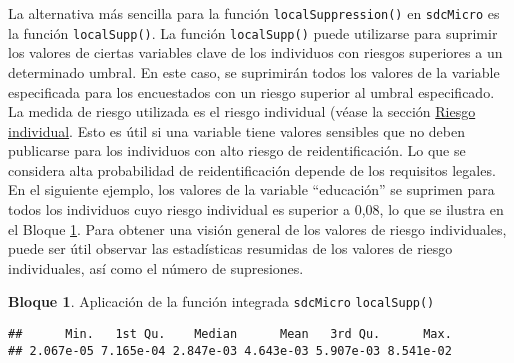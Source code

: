 \documentclass[
]{book}
\newenvironment{Shaded}{\begin{snugshade}}{\end{snugshade}}
\newcommand{\CommentTok}[1]{\textcolor[rgb]{0.56,0.35,0.01}{\textit{#1}}}
\newcommand{\DecValTok}[1]{\textcolor[rgb]{0.00,0.00,0.81}{#1}}
\newcommand{\FloatTok}[1]{\textcolor[rgb]{0.00,0.00,0.81}{#1}}
\newcommand{\FunctionTok}[1]{\textcolor[rgb]{0.00,0.00,0.00}{#1}}
\newcommand{\NormalTok}[1]{#1}
\newcommand{\SpecialCharTok}[1]{\textcolor[rgb]{0.00,0.00,0.00}{#1}}
\theoremstyle{definition}
\theoremstyle{definition}
\newtheorem{example}{Bloque}[chapter]
\theoremstyle{definition}
\theoremstyle{definition}
\theoremstyle{remark}
\begin{document}
La alternativa más sencilla para la función \texttt{localSuppression()} en \texttt{sdcMicro} es la función \texttt{localSupp()}. La función \texttt{localSupp()} puede utilizarse para suprimir los valores de ciertas variables clave de los individuos con riesgos superiores a un determinado umbral. En este caso, se suprimirán todos los valores de la variable especificada para los encuestados con un riesgo superior al umbral especificado. La medida de riesgo utilizada es el riesgo individual (véase la sección \protect\hyperlink{riesgo-individual}{Riesgo individual}. Esto es útil si una variable tiene valores sensibles que no deben publicarse para los individuos con alto riesgo de reidentificación. Lo que se considera alta probabilidad de reidentificación depende de los requisitos legales. En el siguiente ejemplo, los valores de la variable ``educación'' se suprimen para todos los individuos cuyo riesgo individual es superior a 0,08, lo que se ilustra en el Bloque \ref{exm:bloque25jgm}. Para obtener una visión general de los valores de riesgo individuales, puede ser útil observar las estadísticas resumidas de los valores de riesgo individuales, así como el número de supresiones.

\begin{example}
\protect\hypertarget{exm:bloque25jgm}{}\label{exm:bloque25jgm}Aplicación de la función integrada \texttt{sdcMicro} \texttt{localSupp()}
\end{example}

\begin{Shaded}
\end{Shaded}

\begin{verbatim}
##      Min.   1st Qu.    Median      Mean   3rd Qu.      Max. 
## 2.067e-05 7.165e-04 2.847e-03 4.643e-03 5.907e-03 8.541e-02
\end{verbatim}

\begin{Shaded}
\end{Shaded}
\end{document}
